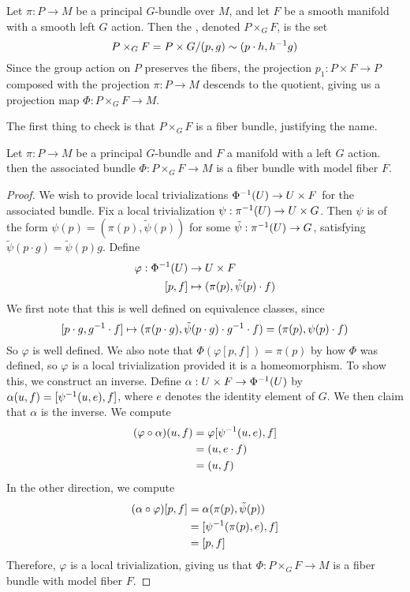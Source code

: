 %
\begin{defn}
Let $\pi : P \to M$ be a principal $G$-bundle over $M$, and let $F$ be a
smooth manifold with a smooth left $G$ action. Then the , denoted $P \times_G F$, is the set
\[
P \times_G F = P \times G / (p,g) \sim (p\cdot h, h^{-1} g)
\]
Since the group action on $P$ preserves the fibers, the projection
$p_1 : P \times F \to P$ composed with the projection $\pi : P \to M$
descends to the quotient, giving us a projection map
$\Phi : P \times_G F \to M$.
\end{defn}
%
The first thing to check is that $P \times_G F$ is a fiber bundle, justifying
the name.
%
\begin{prop}
Let $\pi : P \to M$ be a principal $G$-bundle and $F$ a manifold with a left $G$ action.
then the associated bundle $ \Phi : P \times_G F \to M$ is a fiber bundle with
model fiber $F$.
\end{prop}
%
\begin{proof}
We wish to provide local trivializations  $\Phi^{-1}(U) \to U \times F$ for the
associated bundle. Fix a local trivialization  $\psi : \pi^{-1}(U) \to U \times G$.
Then $\psi$ is of the form $\psi(p) = (\pi(p), \tilde{\psi}(p))$ for some
$\tilde{\psi} : \pi^{-1}(U) \to G$, satisfying $\tilde{\psi}(p\cdot g) = \tilde{\psi}(p)g$.
Define
\begin{align*}
\varphi : \Phi^{-1}(U) &\to U \times F \\
[p,f] &\mapsto (\pi(p), \tilde{\psi}(p)\cdot f)
\end{align*}
We first note that this is well defined on equivalence classes, since
\[
[p\cdot g, g^{-1} \cdot f] \mapsto (\pi(p \cdot g), \tilde{\psi}(p \cdot g)
\cdot g^{-1} \cdot f)
= (\pi(p), \psi(p)\cdot f)
\]
So $\varphi$ is well defined. We also note that $\Phi(\varphi[p,f]) = \pi(p)$
by how $\Phi$ was defined, so $\varphi$ is a local trivialization provided
it is a homeomorphism. To show this, we construct an inverse.
Define $\alpha : U \times F \to \Phi^{-1}(U)$
by $\alpha(u,f) = [\psi^{-1}(u,e), f]$, where $e$ denotes the identity element
of $G$. We then claim that $\alpha$ is the inverse. We compute
%
\begin{align*}
(\varphi \circ \alpha)(u,f) &= \varphi[\psi^{-1}(u,e),f] \\
&= (u, e\cdot f)\\
&= (u,f)
\end{align*}
%
In the other direction, we compute
%
\begin{align*}
(\alpha \circ \varphi)[p,f] &= \alpha(\pi(p), \tilde{\psi}(p)) \\
&= [\psi^{-1}(\pi(p), e), f] \\
&= [p, f]
\end{align*}
%
Therefore, $\varphi$ is a local trivialization, giving us that
$\Phi: P \times_G F \to M$ is a fiber bundle with model fiber $F$.
%
\end{proof}
